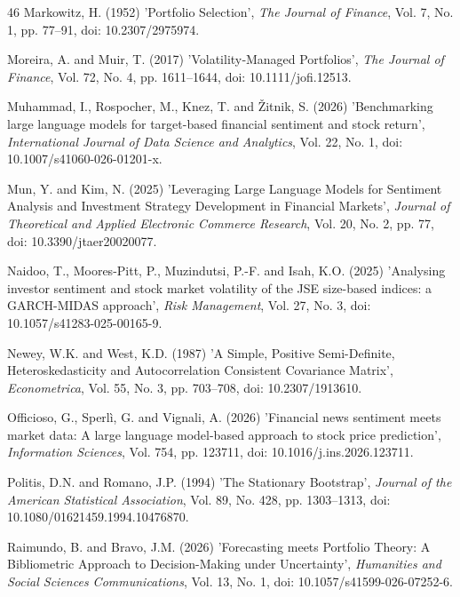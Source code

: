 \begin{thebibliography}{46}
Markowitz, H. (1952) 'Portfolio Selection', {\it The Journal of Finance}, Vol. 7, No. 1, pp. 77--91, doi: 10.2307/2975974.

Moreira, A. and Muir, T. (2017) 'Volatility‐Managed Portfolios', {\it The Journal of Finance}, Vol. 72, No. 4, pp. 1611--1644, doi: 10.1111/jofi.12513.

Muhammad, I., Rospocher, M., Knez, T. and Žitnik, S. (2026) 'Benchmarking large language models for target-based financial sentiment and stock return', {\it International Journal of Data Science and Analytics}, Vol. 22, No. 1, doi: 10.1007/s41060-026-01201-x.

Mun, Y. and Kim, N. (2025) 'Leveraging Large Language Models for Sentiment Analysis and Investment Strategy Development in Financial Markets', {\it Journal of Theoretical and Applied Electronic Commerce Research}, Vol. 20, No. 2, pp. 77, doi: 10.3390/jtaer20020077.

Naidoo, T., Moores-Pitt, P., Muzindutsi, P.-F. and Isah, K.O. (2025) 'Analysing investor sentiment and stock market volatility of the JSE size-based indices: a GARCH-MIDAS approach', {\it Risk Management}, Vol. 27, No. 3, doi: 10.1057/s41283-025-00165-9.

Newey, W.K. and West, K.D. (1987) 'A Simple, Positive Semi-Definite, Heteroskedasticity and Autocorrelation Consistent Covariance Matrix', {\it Econometrica}, Vol. 55, No. 3, pp. 703--708, doi: 10.2307/1913610.

Officioso, G., Sperlì, G. and Vignali, A. (2026) 'Financial news sentiment meets market data: A large language model-based approach to stock price prediction', {\it Information Sciences}, Vol. 754, pp. 123711, doi: 10.1016/j.ins.2026.123711.

Politis, D.N. and Romano, J.P. (1994) 'The Stationary Bootstrap', {\it Journal of the American Statistical Association}, Vol. 89, No. 428, pp. 1303--1313, doi: 10.1080/01621459.1994.10476870.

Raimundo, B. and Bravo, J.M. (2026) 'Forecasting meets Portfolio Theory: A Bibliometric Approach to Decision-Making under Uncertainty', {\it Humanities and Social Sciences Communications}, Vol. 13, No. 1, doi: 10.1057/s41599-026-07252-6.


\end{thebibliography}
